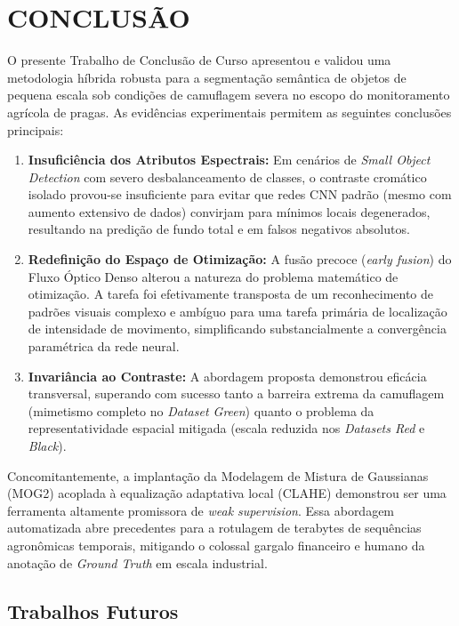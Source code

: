 \chapter{CONCLUSÃO}\label{cap:conclusao}

O presente Trabalho de Conclusão de Curso apresentou e validou uma metodologia híbrida robusta para a segmentação semântica de objetos de pequena escala sob condições de camuflagem severa no escopo do monitoramento agrícola de pragas. As evidências experimentais permitem as seguintes conclusões principais:

\begin{enumerate}
    \item \textbf{Insuficiência dos Atributos Espectrais:} Em cenários de \textit{Small Object Detection} com severo desbalanceamento de classes, o contraste cromático isolado provou-se insuficiente para evitar que redes CNN padrão (mesmo com aumento extensivo de dados) convirjam para mínimos locais degenerados, resultando na predição de fundo total e em falsos negativos absolutos.
    \item \textbf{Redefinição do Espaço de Otimização:} A fusão precoce (\textit{early fusion}) do Fluxo Óptico Denso alterou a natureza do problema matemático de otimização. A tarefa foi efetivamente transposta de um reconhecimento de padrões visuais complexo e ambíguo para uma tarefa primária de localização de intensidade de movimento, simplificando substancialmente a convergência paramétrica da rede neural.
    \item \textbf{Invariância ao Contraste:} A abordagem proposta demonstrou eficácia transversal, superando com sucesso tanto a barreira extrema da camuflagem (mimetismo completo no \textit{Dataset Green}) quanto o problema da representatividade espacial mitigada (escala reduzida nos \textit{Datasets Red} e \textit{Black}).
\end{enumerate}

Concomitantemente, a implantação da Modelagem de Mistura de Gaussianas (MOG2) acoplada à equalização adaptativa local (CLAHE) demonstrou ser uma ferramenta altamente promissora de \textit{weak supervision}. Essa abordagem automatizada abre precedentes para a rotulagem de terabytes de sequências agronômicas temporais, mitigando o colossal gargalo financeiro e humano da anotação de \textit{Ground Truth} em escala industrial.

\section{Trabalhos Futuros}

